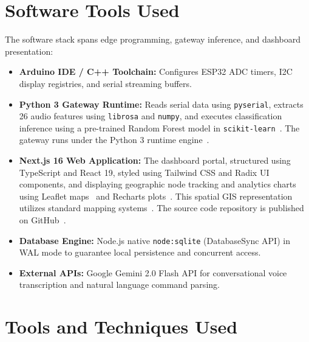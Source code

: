 \documentclass[11pt,a4paper,oneside]{report}
\begin{document}
\section{Software Tools Used}
The software stack spans edge programming, gateway inference, and dashboard presentation:
\begin{itemize}
    \item \textbf{Arduino IDE / C++ Toolchain:} Configures ESP32 ADC timers, I2C display registries, and serial streaming buffers.
    \item \textbf{Python 3 Gateway Runtime:} Reads serial data using \texttt{pyserial}, extracts 26 audio features using \texttt{librosa} and \texttt{numpy}, and executes classification inference using a pre-trained Random Forest model in \texttt{scikit-learn}~\cite{ref_scikit}. The gateway runs under the Python 3 runtime engine~\cite{ref_python}.
    \item \textbf{Next.js 16 Web Application:} The dashboard portal, structured using TypeScript and React 19, styled using Tailwind CSS and Radix UI components, and displaying geographic node tracking and analytics charts using Leaflet maps~\cite{ref_leaflet} and Recharts plots~\cite{ref_nextjs}. This spatial GIS representation utilizes standard mapping systems~\cite{ref_shekhar}. The source code repository is published on GitHub~\cite{ref_source}.
    \item \textbf{Database Engine:} Node.js native \texttt{node:sqlite} (DatabaseSync API) in WAL mode to guarantee local persistence and concurrent access.
    \item \textbf{External APIs:} Google Gemini 2.0 Flash API for conversational voice transcription and natural language command parsing.
\end{itemize}

\section{Tools and Techniques Used}
\end{document}
